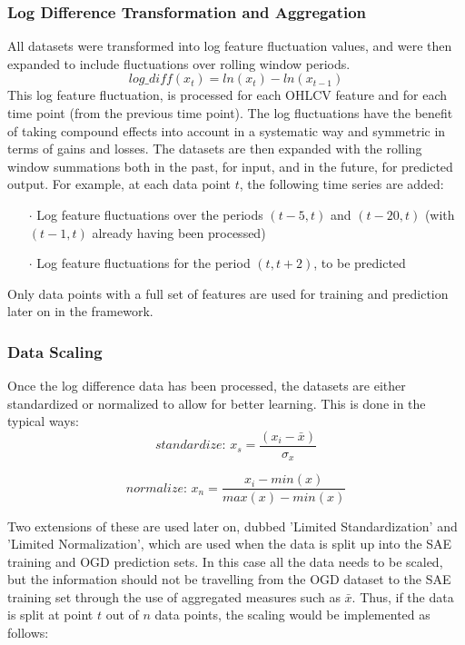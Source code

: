 \documentclass[a4paper,latin]{paper}
\begin{document}
\subsubsection{Log Difference Transformation and Aggregation}\label{ldata_og_difference}
All datasets were transformed into log feature fluctuation values, and were then expanded to include fluctuations over rolling window periods.
\begin{equation}
\textit{log\_diff}(x_t) = ln(x_t) - ln(x_{t-1})
\end{equation}
This log feature fluctuation,  is processed for each OHLCV feature and for each time point (from the previous time point). The log fluctuations have the benefit of taking compound effects into account in a systematic way and symmetric in terms of gains and losses.
\newline\newline
The datasets are then expanded with the rolling window summations both in the past, for input, and in the future, for predicted output. For example, at each data point $t$, the following time series are added:
\begin{itemize}
	\item [$\cdot$] Log feature fluctuations over the periods $(t-5, t)$ and $(t-20, t)$ (with $(t-1, t)$ already having been processed)
	\item [$\cdot$] Log feature fluctuations for the period $(t, t + 2)$, to be predicted 
\end{itemize}

Only data points with a full set of features are used for training and prediction later on in the framework.

\subsubsection{Data Scaling}\label{data_scaling}
Once the log difference data has been processed, the datasets are either standardized or normalized to allow for better learning. This is done in the typical ways:
\begin{equation}
\textit{standardize:  }x_s = \frac{(x_i - \bar{x}) }{\sigma_x}
\end{equation}

\begin{equation}
\textit{normalize:  }x_n = \frac{x_i - min(x) }{max(x) - min(x)}
\end{equation}

Two extensions of these are used later on, dubbed 'Limited Standardization' and 'Limited Normalization', which are used when the data is split up into the SAE training and OGD prediction sets. In this case all the data needs to be scaled, but the information should not be travelling from the OGD dataset to the SAE training set through the use of aggregated measures such as $\bar{x}$. Thus, if the data is split at point $t$ out of $n$ data points, the scaling would be implemented as follows:
\end{document}
